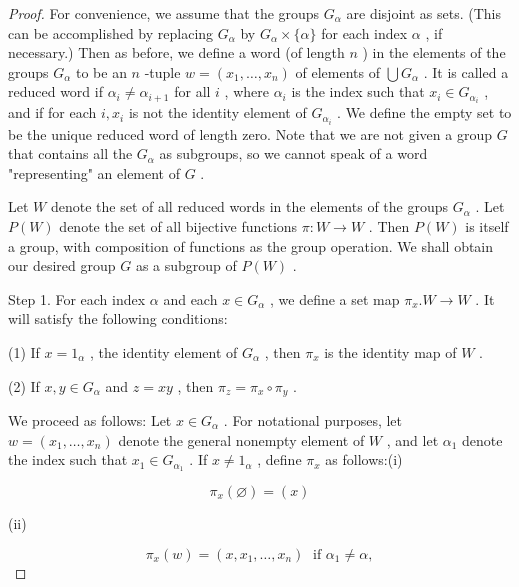 \begin{proof}For convenience, we assume that the groups \({G}_{\alpha }\) are disjoint as sets. (This can be accomplished by replacing \({G}_{\alpha }\) by \({G}_{\alpha } \times  \{ \alpha \}\) for each index \(\alpha\) , if necessary.)
Then as before, we define a word (of length \(n\) ) in the elements of the groups \({G}_{\alpha }\) to be an \(n\) -tuple \(w = \left( {{x}_{1},\ldots ,{x}_{n}}\right)\) of elements of \(\bigcup {G}_{\alpha }\) . It is called a reduced word if \({\alpha }_{i} \neq  {\alpha }_{i + 1}\) for all \(i\) , where \({\alpha }_{i}\) is the index such that \({x}_{i} \in  {G}_{{\alpha }_{i}}\) , and if for each \(i,{x}_{i}\) is not the identity element of \({G}_{{\alpha }_{i}}\) . We define the empty set to be the unique reduced word of length zero. Note that we are not given a group \(G\) that contains all the \({G}_{\alpha }\) as subgroups, so we cannot speak of a word "representing" an element of \(G\) .

Let \(W\) denote the set of all reduced words in the elements of the groups \({G}_{\alpha }\) . Let \(P\left( W\right)\) denote the set of all bijective functions \(\pi  : W \rightarrow  W\) . Then \(P\left( W\right)\) is itself a group, with composition of functions as the group operation. We shall obtain our desired group \(G\) as a subgroup of \(P\left( W\right)\) .

Step 1. For each index \(\alpha\) and each \(x \in  {G}_{\alpha }\) , we define a set map \({\pi }_{x}.W \rightarrow  W\) . It will satisfy the following conditions:

(1) If \(x = {1}_{\alpha }\) , the identity element of \({G}_{\alpha }\) , then \({\pi }_{x}\) is the identity map of \(W\) .

(2) If \(x,y \in  {G}_{\alpha }\) and \(z = {xy}\) , then \({\pi }_{z} = {\pi }_{x} \circ  {\pi }_{y}\) .

We proceed as follows: Let \(x \in  {G}_{\alpha }\) . For notational purposes, let \(w = \left( {{x}_{1},\ldots ,{x}_{n}}\right)\) denote the general nonempty element of \(W\) , and let \({\alpha }_{1}\) denote the index such that \({x}_{1} \in  {G}_{{\alpha }_{1}}\) . If \(x \neq  {1}_{\alpha }\) , define \({\pi }_{x}\) as follows:(i)

\[
{\pi }_{x}\left( \varnothing \right)  = \left( x\right)
\]

(ii)

\[
{\pi }_{x}\left( w\right)  = \left( {x,{x}_{1},\ldots ,{x}_{n}}\right) \;\text{ if }{\alpha }_{1} \neq  \alpha ,
\]


\end{proof}
